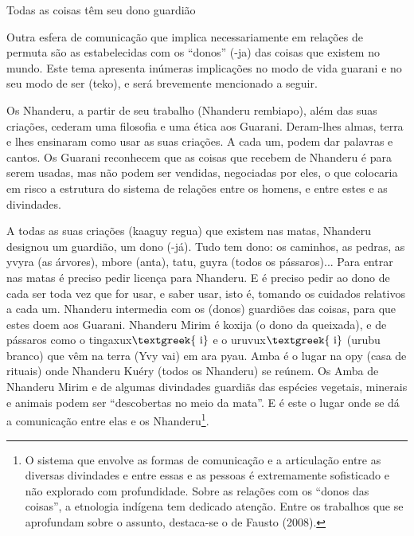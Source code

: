 \documentclass{article}
\begin{document}
Todas as coisas t\^em seu dono guardi\~ao

Outra esfera de comunica\c{c}\~ao que implica necessariamente em
rela\c{c}\~oes de permuta s\~ao as estabelecidas com os
{\textquotedblleft}donos{\textquotedblright} (-ja) das coisas que
existem no mundo. Este tema apresenta in\'umeras implica\c{c}\~oes no
modo de vida guarani e no seu modo de ser (teko), e ser\'a brevemente
mencionado a seguir.  

Os Nhanderu, a partir de seu trabalho (Nhanderu rembiapo), al\'em das
suas cria\c{c}\~oes, cederam uma filosofia e uma \'etica aos Guarani.
Deram-lhes almas, terra e lhes ensinaram como usar as suas
cria\c{c}\~oes. A cada um, podem dar palavras e cantos. Os Guarani
reconhecem que as coisas que recebem de Nhanderu \'e para serem usadas,
mas n\~ao podem ser vendidas, negociadas por eles, o que colocaria em
risco a estrutura do sistema de rela\c{c}\~oes entre os homens, e entre
estes e as divindades. 

A todas as suas cria\c{c}\~oes (kaaguy regua) que existem nas matas,
Nhanderu designou um guardi\~ao, um dono (-j\'a). Tudo tem dono: os
caminhos, as pedras, as yvyra (as \'arvores), mbore (anta), tatu, guyra
(todos os p\'assaros)... Para entrar nas matas \'e preciso pedir
licen\c{c}a para Nhanderu. E \'e preciso pedir ao dono de cada ser toda
vez que for usar, e saber usar, isto \'e, tomando os cuidados relativos
a cada um. Nhanderu intermedia com os (donos) guardi\~oes das coisas,
para que estes doem aos Guarani.  Nhanderu Mirim \'e koxija (o dono da
queixada), e de p\'assaros como o tingaxux$\text{\textgreek{~i}}$ e o
uruvux$\text{\textgreek{~i}}$ (urubu branco) que v\^em na terra (Yvy
vai) em ara pyau. Amba \'e o lugar na opy (casa de rituais) onde
Nhanderu Ku\'ery (todos os Nhanderu) se re\'unem. Os Amba de Nhanderu
Mirim e de algumas divindades guardi\~as das esp\'ecies vegetais,
minerais e animais podem ser {\textquotedblleft}descobertas no meio da
mata{\textquotedblright}. E \'e este o lugar onde se d\'a a
comunica\c{c}\~ao entre elas e os Nhanderu\footnote{ O sistema que
envolve as formas de comunica\c{c}\~ao e a articula\c{c}\~ao entre as
diversas divindades e entre essas e as pessoas \'e extremamente
sofisticado e n\~ao explorado com profundidade. Sobre as rela\c{c}\~oes
com os {\textquotedblleft}donos das coisas{\textquotedblright}, a
etnologia ind\'igena tem dedicado aten\c{c}\~ao. Entre os trabalhos que
se aprofundam sobre o assunto, destaca-se o de Fausto (2008). }. 
\end{document}
